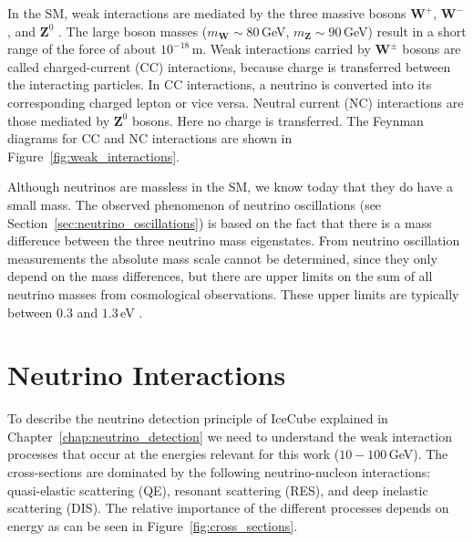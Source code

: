 In the SM, weak interactions are mediated by the three massive bosons $\textbf{W}^+$, $\textbf{W}^-$, and $\textbf{Z}^0$ \cite{Thomson_Particle}.
The large boson masses ($m_{\textbf{W}}\sim80$\,GeV, $m_{\textbf{Z}}\sim90$\,GeV) result in a short range of the force of about $10^{-18}$\,m.
Weak interactions carried by $\textbf{W}^\pm$ bosons are called charged-current (CC) interactions, because charge is transferred between the interacting particles.
In CC interactions, a neutrino is converted into its corresponding charged lepton or vice versa.
Neutral current (NC) interactions are those mediated by $\textbf{Z}^0$ bosons.
Here no charge is transferred.
The Feynman diagrams for CC and NC interactions are shown in Figure~\ref{fig:weak_interactions}.

Although neutrinos are massless in the SM, we know today that they do have a small mass.
The observed phenomenon of neutrino oscillations (see Section~\ref{sec:neutrino_oscillations}) is based on the fact that there is a mass difference between the three neutrino mass eigenstates.
From neutrino oscillation measurements the absolute mass scale cannot be determined, since they only depend on the mass differences, but there are upper limits on the sum of all neutrino masses from cosmological observations.
These upper limits are typically between $0.3$ and $1.3$\,eV \cite{PhysRevD.98.030001}.


\section{Neutrino Interactions} \label{sec:neutrino_interactions}

To describe the neutrino detection principle of IceCube explained in Chapter~\ref{chap:neutrino_detection} we need to understand the weak interaction processes that occur at the energies relevant for this work ($10-100$\,GeV).
The cross-sections are dominated by the following neutrino-nucleon interactions: quasi-elastic scattering (QE), resonant scattering (RES), and deep inelastic scattering (DIS).
The relative importance of the different processes depends on energy as can be seen in Figure~\ref{fig:cross_sections}.

